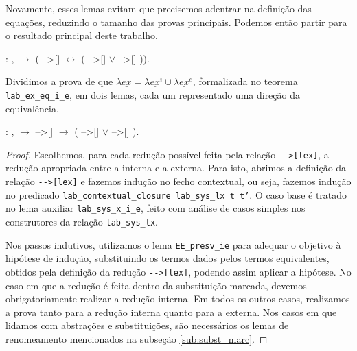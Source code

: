 Novamente, esses lemas evitam que precisemos adentrar na definição das
equações, reduzindo o tamanho das provas principais. Podemos então partir para
o resultado principal deste trabalho.

\bigskip

 :
\coqdockw{\ensuremath{\forall}}  ,
  \ensuremath{\rightarrow} (
-->[]  \ensuremath{\leftrightarrow} (
-->[]  \ensuremath{\lor} 
-->[] )).\coqdoceol

\bigskip

Dividimos a prova de que $\lambda \underline{ex} =
\lambda \underline{ex}^i \cup \lambda \underline{ex}^e$, formalizada no teorema
\texttt{lab\_ex\_eq\_i\_e}, em dois lemas, cada um representado uma direção da
equivalência.

\bigskip

\coqdocnoindent {} :
\coqdockw{\ensuremath{\forall}}  ,
  \ensuremath{\rightarrow} 
-->[]  \ensuremath{\rightarrow} (
-->[]  \ensuremath{\lor} 
-->[] ).\coqdoceol

\begin{addmargin}[1em]{2em}
\begin{proof}
Escolhemos, para cada redução possível feita pela relação
\texttt{-{}->[lex]}, a redução apropriada entre a interna e a externa.  Para
isto, abrimos a definição da relação \texttt{-{}->[lex]} e fazemos indução no
fecho contextual, ou seja, fazemos indução no predicado
\texttt{lab\_contextual\_closure lab\_sys\_lx t t'}. O caso base é tratado no
lema auxiliar \texttt{lab\_sys\_x\_i\_e}, feito com análise de casos simples nos
construtores da relação \texttt{lab\_sys\_lx}. 

Nos passos indutivos, utilizamos o lema \texttt{EE\_presv\_ie} para adequar o
objetivo à hipótese de indução, substituindo os termos dados pelos termos
equivalentes, obtidos pela definição da redução \texttt{-{}->[lex]}, podendo assim
aplicar a hipótese. No caso em que a redução é feita dentro da substituição
marcada, devemos obrigatoriamente realizar a redução interna. Em todos os outros
casos, realizamos a prova tanto para a redução interna quanto para a externa.
Nos casos em que lidamos com abstrações e substituições, são necessários os
lemas de renomeamento mencionados na subseção \ref{sub:subst_marc}.
\end{proof}

\end{addmargin}


